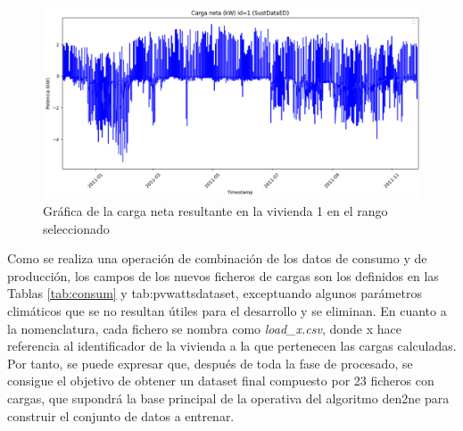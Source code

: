\begin{figure}[H]
  \centering
  \includegraphics[width=1\textwidth]{img/diseno/calculocarga2.png}
  \caption{Gráfica de la carga neta resultante en la vivienda 1 en el rango seleccionado}
  \label{fig:calculocarga2}
\end{figure}

\vspace{3mm}

Como se realiza una operación de combinación de los datos de consumo y de producción, los campos de los nuevos ficheros de cargas son los definidos en las Tablas \ref{tab:consum} y {tab:pvwattsdataset}, exceptuando algunos parámetros climáticos que se no resultan útiles para el desarrollo y se eliminan. En cuanto a la nomenclatura, cada fichero se nombra como \textit{load\_x.csv}, donde x hace referencia al identificador de la vivienda a la que pertenecen las cargas calculadas. Por tanto, se puede expresar que, después de toda la fase de procesado, se consigue el objetivo de obtener un dataset final compuesto por 23 ficheros con cargas, que supondrá la base principal de la operativa del algoritmo \gls{den2ne} para construir el conjunto de datos a entrenar.

